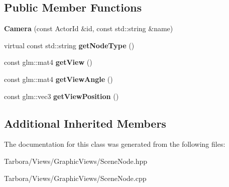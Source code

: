 \subsection*{Public Member Functions}
\begin{DoxyCompactItemize}
\item 
\mbox{\label{classTarbora_1_1Camera_a0ed2ee75de95876075030ceb5668388a}} 
{\bfseries Camera} (const Actor\+Id \&id, const std\+::string \&name)
\item 
\mbox{\label{classTarbora_1_1Camera_aa19a558bbebad66dfb99ded6f7f1f460}} 
virtual const std\+::string {\bfseries get\+Node\+Type} ()
\item 
\mbox{\label{classTarbora_1_1Camera_a1e0456e7f2772ddf87dac98a4cb9c71c}} 
const glm\+::mat4 {\bfseries get\+View} ()
\item 
\mbox{\label{classTarbora_1_1Camera_a93ed5f108fbe02af6bafe475edcfd7b8}} 
const glm\+::mat4 {\bfseries get\+View\+Angle} ()
\item 
\mbox{\label{classTarbora_1_1Camera_a48791a2903a0641c524e7f0830a1f504}} 
const glm\+::vec3 {\bfseries get\+View\+Position} ()
\end{DoxyCompactItemize}
\subsection*{Additional Inherited Members}


The documentation for this class was generated from the following files\+:\begin{DoxyCompactItemize}
\item 
Tarbora/\+Views/\+Graphic\+Views/Scene\+Node.\+hpp\item 
Tarbora/\+Views/\+Graphic\+Views/Scene\+Node.\+cpp\end{DoxyCompactItemize}
